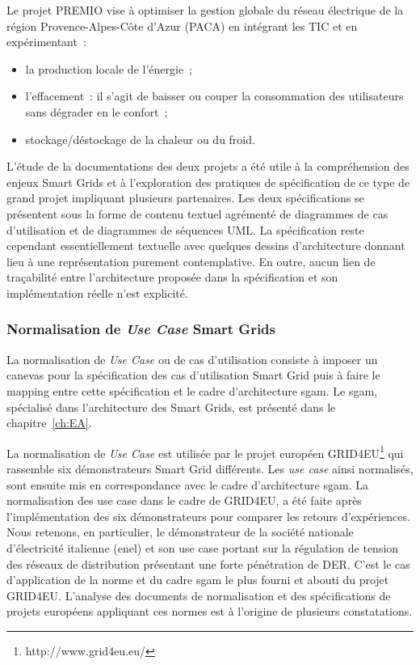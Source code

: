 Le projet PREMIO vise à optimiser la gestion globale du réseau électrique de la
région Provence-Alpes-Côte d'Azur (PACA) en intégrant les TIC et en
expérimentant~:
\begin{itemize}
	\item la production locale de l'énergie~;
	\item l'effacement~: il s'agit de baisser ou couper la consommation des utilisateurs
sans dégrader en le confort~;
	\item stockage/déstockage de la chaleur ou du froid.
\end{itemize}

L'étude de la documentations des deux projets a été utile à la compréhension des
enjeux Smart Grids et à l'exploration des pratiques de spécification de ce type
de grand projet impliquant plusieurs partenaires. Les deux spécifications se
présentent sous la forme de contenu textuel agrémenté de diagrammes de cas
d'utilisation et de diagrammes de séquences UML. La spécification reste
cependant essentiellement textuelle avec quelques dessins d'architecture donnant
lieu à une représentation purement contemplative. En outre, aucun lien de
traçabilité entre l'architecture proposée dans la spécification et son
implémentation réelle n'est explicité.

\subsubsection{Normalisation de \textit{Use Case} Smart Grids}
\label{sec:ENEL}

La normalisation de \textit{Use Case} ou de cas d'utilisation consiste à
imposer un canevas pour la spécification des cas d'utilisation Smart Grid puis à
faire le mapping entre cette spécification et le cadre d'architecture
\gls{sgam}. Le \gls{sgam}, spécialisé dans l'architecture des Smart Grids, est
présenté dans le chapitre~\ref{ch:EA}.

La normalisation de \textit{Use Case} est utilisée par le projet européen
GRID4EU\footnote{http://www.grid4eu.eu/} qui rassemble six démonstrateurs Smart
Grid différents. Les \textit{use case} ainsi normalisés, sont ensuite mis en
correspondance avec le cadre d'architecture \gls{sgam}. La normalisation des use
case dans le cadre de GRID4EU, a été faite après l'implémentation des six
démonstrateurs pour comparer les retours d'expériences. Nous retenons, en
particulier, le démonstrateur de la société nationale d'électricité italienne
(\gls{enel}) et son use case portant sur la régulation de tension des réseaux de
distribution présentant une forte pénétration de DER. C'est le cas d'application
de la norme et du cadre \gls{sgam} le plus fourni et abouti du projet GRID4EU.
L'analyse des documents de normalisation et des spécifications de projets
européens appliquant ces normes est à l'origine de plusieurs constatations.

